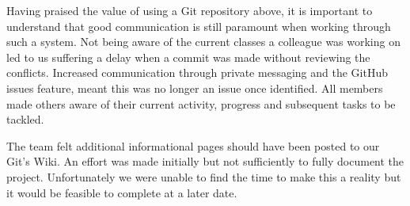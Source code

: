 Having praised the value of using a Git repository above, it is important to understand that good communication is still paramount when working through such a system. Not being aware of the current classes a colleague was working on led to us suffering a delay when a commit was made without reviewing the conflicts. Increased communication through private messaging and the GitHub issues feature, meant this was no longer an issue once identified. All members made others aware of their current activity, progress and subsequent tasks to be tackled.

The team felt additional informational pages should have been posted to our Git's Wiki. An effort was made initially but not sufficiently to fully document the project. Unfortunately we were unable to find the time to make this a reality but it would be feasible to complete at a later date.

